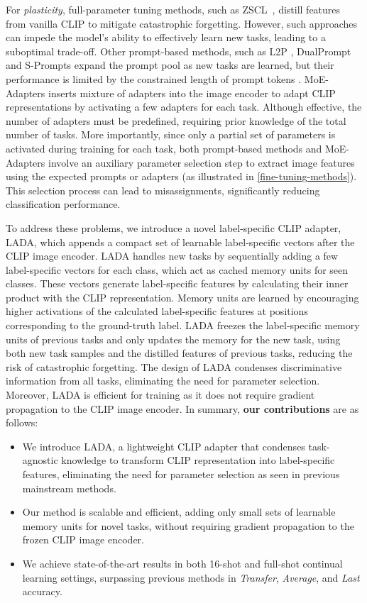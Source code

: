 \documentclass{article}
\theoremstyle{plain}
\theoremstyle{definition}
\theoremstyle{remark}
\def\algo{LADA\xspace}
\begin{document}
For \emph{plasticity}, full-parameter tuning methods, such as ZSCL~\cite{zheng2023preventing}, distill features from vanilla CLIP to mitigate catastrophic forgetting. However, such approaches can impede the model’s ability to effectively learn new tasks, leading to a suboptimal trade-off. Other prompt-based methods, such as L2P \cite{wang2022learning}, DualPrompt \cite{wang2022dualprompt} and S-Prompts \cite{wang2022s} expand the prompt pool as new tasks are learned, but their performance is limited by the constrained length of prompt tokens \cite{zheng2023preventing, tang2024mind}. MoE-Adapters \cite{yu2024boosting} inserts mixture of adapters into the image encoder to adapt CLIP representations by activating a few adapters for each task. Although effective, the number of adapters must be predefined, requiring prior knowledge of the total number of tasks. More importantly, since only a partial set of parameters is activated during training for each task, both prompt-based methods and MoE-Adapters involve an auxiliary parameter selection step to extract image features using the expected prompts or adapters (as illustrated in \cref{fine-tuning-methods}). This selection process can lead to misassignments, significantly reducing classification performance.


To address these problems, we introduce a novel label-specific CLIP adapter, LADA, which appends a compact set of learnable label-specific vectors after the CLIP image encoder.
\algo handles new tasks by sequentially adding a few label-specific vectors for each class, which act as cached memory units for seen classes. These vectors generate label-specific features by calculating their inner product with the CLIP representation. Memory units are learned by encouraging higher activations of the calculated label-specific features at positions corresponding to the ground-truth label. 
\algo freezes the label-specific memory units of previous tasks and only updates the memory for the new task, using both new task samples and the distilled features of previous tasks, reducing the risk of catastrophic forgetting. 
The design of \algo condenses discriminative information from all tasks, eliminating the need for parameter selection. 
Moreover, \algo is efficient for training as it does not require gradient propagation to the CLIP image encoder. 
In summary, \textbf{our contributions} are as follows:
\begin{itemize}
    \item We introduce LADA, a lightweight CLIP adapter that condenses task-agnostic knowledge to transform CLIP representation into label-specific features, eliminating the need for parameter selection as seen in previous mainstream methods.
    \item Our method is scalable and efficient, adding only small sets of learnable memory units for novel tasks, without requiring gradient propagation to the frozen CLIP image encoder.
    \item We achieve state-of-the-art results in both 16-shot and full-shot continual learning settings, surpassing previous methods in \emph{Transfer}, \emph{Average}, and \emph{Last} accuracy.
\end{itemize}
\end{document}
